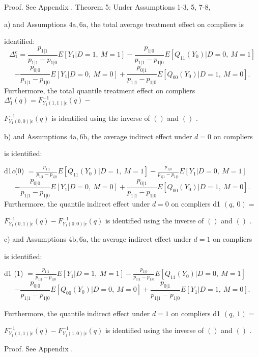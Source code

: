 \documentclass[a4paper,12pt]{article}
\begin{document}
Proof. See Appendix . Theorem 5: Under Assumptions 1-3, 5, 7-8,

a) and Assumptions $4\mathrm{a}, 6\mathrm{a}$, the total average treatment effect on compliers is

identified:
$$
\Delta_{1}^{c}=\frac{p_{1|1}}{p_{1|1}-p_{1|0}}E[Y_{1}|D=1,\ M=1]-\frac{p_{1|0}}{p_{1|1}-p_{1|0}}E[Q_{11}(Y_{0})|D=0,\ M=1]
$$
$$
-\frac{p_{0|0}}{p_{1|1}-p_{1|0}}E[Y_{1}|D=0,\ M=0]+\frac{p_{0|1}}{p_{1|1}-p_{1|0}}E[Q_{00}(Y_{0})|D=1,\ M=0].
$$
Furthermore, the total quantile treatment effect on compliers $\Delta_{1}^{c}(q)=F_{Y_{1}(1,1)|c}^{-1}(q)-$

$F_{Y_{1}(0,0)|c}^{-1}(q)$ is identified using the inverse of $()$ and $()$ .

b) and Assumptions $4\mathrm{a}, 6\mathrm{b}$, the average indirect effect under $d=0$ on compliers

is identified:

d1{\it c}(0) $=\displaystyle \frac{p_{1|1}}{p_{1|1}-p_{1|0}}E[Q_{11}(Y_{0})|D=1,\ M=1]-\frac{p_{1|0}}{p_{1|1}-p_{1|0}}E[Y_{1}|D=0,\ M=1]$
$$
-\frac{p_{0|0}}{p_{1|1}-p_{1|0}}E[Y_{1}|D=0,\ M=0]+\frac{p_{0|1}}{p_{1|1}-p_{1|0}}E[Q_{00}(Y_{0})|D=1,\ M=0].
$$
Furthermore, the quantile indirect effect under $d=0$ on compliers d1 $(q,\ 0) =$

$F_{Y_{1}(0,1)|c}^{-1}(q)-F_{Y_{1}(0,0)|c}^{-1}(q)$ is identified using the inverse of $()$ and $()$ .

c) and Assumptions $4\mathrm{b}, 6\mathrm{a}$, the average indirect effect under $d=1$ on compliers

is identified:
\begin{center}
d1 (1) $=\displaystyle \frac{p_{1|1}}{p_{1|1}-p_{1|0}}E[Y_{1}|D=1,\ M=1]-\frac{p_{1|0}}{p_{1|1}-p_{1|0}}E[Q_{11}(Y_{0})|D=0,\ M=1]$
$$
-\frac{p_{0|0}}{p_{1|1}-p_{1|0}}E[Q_{00}(Y_{0})|D=0,\ M=0]+\frac{p_{0|1}}{p_{1|1}-p_{1|0}}E[Y_{1}|D=1,\ M=0].
$$
\end{center}
Furthermore, the quantile indirect effect under $d= 1$ on compliers d1 $(q,\ 1) =$

$F_{Y_{1}(1,1)|c}^{-1}(q)-F_{Y_{1}(1,0)|c}^{-1}(q)$ is identified using the inverse of $()$ and $()$ .

Proof. See Appendix .
\end{document}
